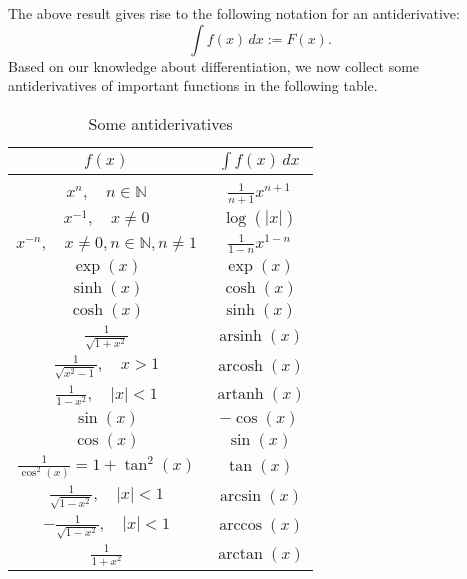 The above result gives rise to the following notation for an antiderivative:
\[\int f(x)\, dx:=F(x).\]
Based on our knowledge about differentiation, we now collect some antiderivatives of important functions in the following table.
\renewcommand{\arraystretch}{1.5}
\begin{table}[h!]\label{tab:SomeAntiderivatives}\begin{center}
\begin{tabular}{|c|c|}
\hline $f(x)$&$\int f(x)\, dx$\\
\hline\hline&\\[-0.7cm]
    $\displaystyle x^n,\quad n\in\mathbb{N}$& $\displaystyle \frac1{n+1}x^{n+1}$\\\hline
$\displaystyle x^{-1},\quad x\neq0$& $\displaystyle \log(|x|)$\\\hline
    $\displaystyle x^{-n},\quad x\neq0,n\in\mathbb{N}, n\neq1$& $\displaystyle \frac1{1-n}x^{1-n}$\\\hline
$\displaystyle \exp(x)$& $\displaystyle \exp(x)$\\\hline
$\displaystyle \sinh(x)$& $\displaystyle \cosh(x)$\\\hline
$\displaystyle \cosh(x)$& $\displaystyle \sinh(x)$\\\hline
$\displaystyle \frac1{\sqrt{1+x^2}}$&$\displaystyle\operatorname{arsinh}(x)$\\\hline 
$\displaystyle \frac1{\sqrt{x^2-1}},\quad x>1$&$\displaystyle\operatorname{arcosh}(x)$\\\hline
$\displaystyle \frac1{1-x^2},\quad |x|<1$&$\displaystyle\operatorname{artanh}(x)$\\\hline
$\displaystyle \sin(x)$& $\displaystyle-\cos(x)$\\\hline
$\displaystyle \cos(x)$& $\displaystyle\sin(x)$\\\hline
$\displaystyle \frac1{\cos^2(x)}=1+\tan^2(x)$& $\displaystyle \tan(x)$\\\hline
$\displaystyle \frac1{\sqrt{1-x^2}},\quad|x|<1$& $\displaystyle \arcsin(x)$\\\hline
$\displaystyle -\frac1{\sqrt{1-x^2}},\quad|x|<1$& $\displaystyle \arccos(x)$\\\hline
$\displaystyle \frac1{1+x^2}$& $\displaystyle \arctan(x)$\\\hline
\end{tabular}~\\~\\\caption{Some antiderivatives}\label{tab:antider}\end{center}
\end{table}
\renewcommand{\arraystretch}{1}


